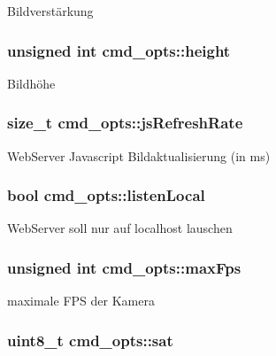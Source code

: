 Bildverstärkung \hypertarget{structcmd__opts_a0ab9c9cf886559f8cf19dd2f7be072fb}{
\subsubsection[{height}]{\setlength{\rightskip}{0pt plus 5cm}unsigned int cmd\+\_\+opts\+::height}}\label{structcmd__opts_a0ab9c9cf886559f8cf19dd2f7be072fb}
Bildhöhe \hypertarget{structcmd__opts_af3bc7afbf82fe94305a11352c584fb6e}{
\subsubsection[{js\+Refresh\+Rate}]{\setlength{\rightskip}{0pt plus 5cm}size\+\_\+t cmd\+\_\+opts\+::js\+Refresh\+Rate}}\label{structcmd__opts_af3bc7afbf82fe94305a11352c584fb6e}
Web\+Server Javascript Bildaktualisierung (in ms) \hypertarget{structcmd__opts_a9d2405b56bef96f631ac27a4d3ff3cb4}{
\subsubsection[{listen\+Local}]{\setlength{\rightskip}{0pt plus 5cm}bool cmd\+\_\+opts\+::listen\+Local}}\label{structcmd__opts_a9d2405b56bef96f631ac27a4d3ff3cb4}
Web\+Server soll nur auf localhost lauschen \hypertarget{structcmd__opts_a2b42f4e7bd954f5ac87c82e9d19a9b84}{
\subsubsection[{max\+Fps}]{\setlength{\rightskip}{0pt plus 5cm}unsigned int cmd\+\_\+opts\+::max\+Fps}}\label{structcmd__opts_a2b42f4e7bd954f5ac87c82e9d19a9b84}
maximale F\+P\+S der Kamera \hypertarget{structcmd__opts_aa83f2910f6a1803ee8c9f9e3581db314}{
\subsubsection[{sat}]{\setlength{\rightskip}{0pt plus 5cm}uint8\+\_\+t cmd\+\_\+opts\+::sat}}\label{structcmd__opts_aa83f2910f6a1803ee8c9f9e3581db314}
